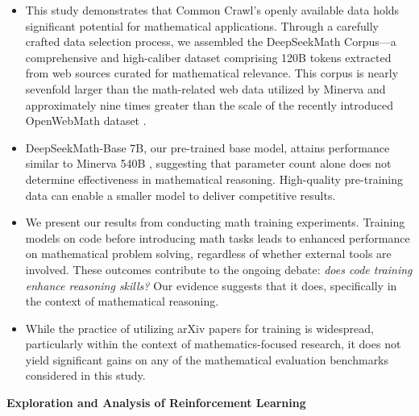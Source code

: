 \begin{itemize}[topsep=0pt]
    \item This study demonstrates that Common Crawl's openly available data holds significant potential for mathematical applications. Through a carefully crafted data selection process, we assembled the DeepSeekMath Corpus—a comprehensive and high-caliber dataset comprising 120B tokens extracted from web sources curated for mathematical relevance. This corpus is nearly sevenfold larger than the math-related web data utilized by Minerva \citep{minerva} and approximately nine times greater than the scale of the recently introduced OpenWebMath dataset \citep{openwebmath}.

\item DeepSeekMath-Base 7B, our pre-trained base model, attains performance similar to Minerva 540B \citep{minerva}, suggesting that parameter count alone does not determine effectiveness in mathematical reasoning. High-quality pre-training data can enable a smaller model to deliver competitive results.

\item We present our results from conducting math training experiments. Training models on code before introducing math tasks leads to enhanced performance on mathematical problem solving, regardless of whether external tools are involved. These outcomes contribute to the ongoing debate: \textit{does code training enhance reasoning skills?} Our evidence suggests that it does, specifically in the context of mathematical reasoning.

\item While the practice of utilizing arXiv papers for training is widespread, particularly within the context of mathematics-focused research, it does not yield significant gains on any of the mathematical evaluation benchmarks considered in this study.
\end{itemize}

\textbf{Exploration and Analysis of Reinforcement Learning}

